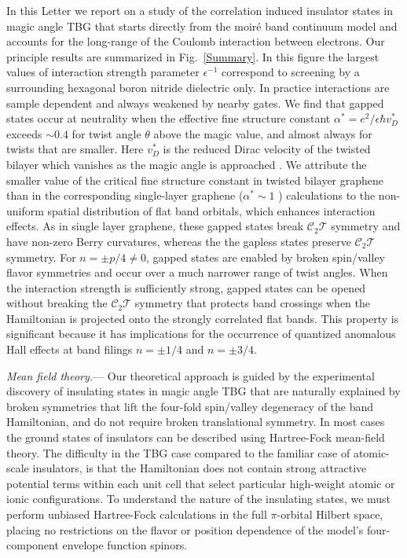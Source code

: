 \documentclass[aps,prl,reprint,amssymb,groupedaddress,twocolumn]{revtex4}
\newcommand{\CT}{$\mathcal{C}_2\mathcal{T}$ }
\begin{document}
In this Letter we report on a study of the correlation induced insulator states in magic angle TBG that starts directly from the 
moir{\' e} band continuum model and accounts for the long-range of the Coulomb interaction between electrons.
Our principle results are summarized in Fig.~\ref{Summary}.
In this figure the largest values of interaction strength parameter $\epsilon^{-1}$ correspond to 
screening by a surrounding hexagonal boron nitride dielectric only.  In practice interactions are sample dependent and 
always weakened by nearby gates.  We find that gapped states occur at
neutrality when the effective fine structure constant $\alpha^*=e^2/\epsilon\hbar v_D^*$ exceeds 
$\sim 0.4$ for twist angle $\theta$ above the magic value, and almost always for twists that are smaller.  
Here $v_D^*$ is the reduced Dirac velocity of the twisted
bilayer which vanishes as the magic angle is approached \cite{BMModel}.
We attribute the smaller value of the critical fine structure constant in twisted bilayer graphene 
than in the corresponding single-layer graphene ($\alpha^* \sim 1$ \cite{Min})
calculations to the non-uniform spatial distribution of flat band orbitals, which enhances interaction effects. 
As in single layer graphene\cite{AllanMonolayer}, these gapped states
break \CT symmetry and have non-zero Berry curvatures, whereas the 
the gapless states preserve \CT symmetry.
For $n= \pm p/4 \ne 0$, gapped states are enabled by broken spin/valley
flavor symmetries and occur over a much narrower range of twist angles.
When the interaction strength is sufficiently strong, gapped states can be opened without breaking
the \CT symmetry that protects band crossings when the Hamiltonian is projected onto the strongly correlated flat bands.
This property is significant because it has implications for the occurrence of quantized anomalous 
Hall effects at band filings $n = \pm 1/4$ and $n = \pm 3/4$. 

{\em Mean field theory.}---\noindent
Our theoretical approach is guided by the experimental \cite{CaoInsulator} 
discovery of insulating states in magic angle TBG that are 
naturally explained by broken symmetries that lift 
the four-fold spin/valley degeneracy of the band Hamiltonian, and do not require broken translational symmetry.  
In most cases the ground states of insulators can be described using 
Hartree-Fock mean-field theory.
The difficulty in the TBG case compared to the familiar case of atomic-scale insulators,
is that the Hamiltonian does not contain strong attractive 
potential terms within each unit cell that select particular high-weight atomic or ionic configurations.
To understand the nature of the insulating states, we must perform unbiased Hartree-Fock
calculations in the full \cite{footnote} $\pi$-orbital Hilbert space, placing no restrictions 
on the flavor or position dependence of the model's four-component envelope function spinors.
\end{document}
